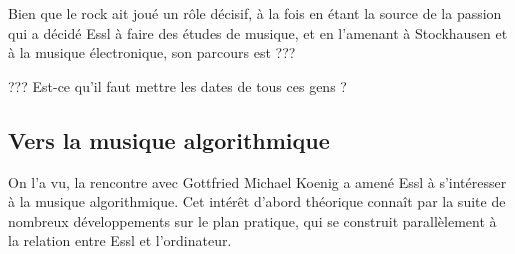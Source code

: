 \documentclass[a4paper,12pt]{article}
\begin{document}
Bien que le rock ait joué un rôle décisif, à la fois en étant la source de la passion qui a décidé Essl à faire des études de musique, et en l'amenant à Stockhausen et à la musique électronique, son parcours est ???

??? Est-ce qu'il faut mettre les dates de tous ces gens ?

\subsection{Vers la musique algorithmique}

On l'a vu, la rencontre avec Gottfried Michael Koenig a amené Essl à s'intéresser à la musique algorithmique. Cet intérêt d'abord théorique connaît par la suite de nombreux développements sur le plan pratique, qui se construit parallèlement à la relation entre Essl et l'ordinateur.
\end{document}
